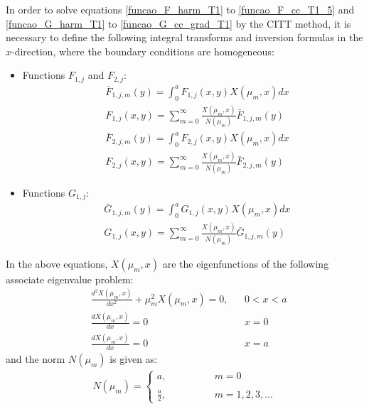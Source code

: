 \documentclass[conference,compsoc,fleqn]{IEEEtran}
\begin{document}
In order to solve equations \eqref{funcao_F_harm_T1} to \eqref{funcao_F_cc_T1_5} and \eqref{funcao_G_harm_T1} to \eqref{funcao_G_cc_grad_T1} by the CITT method, it is necessary to define the following integral transforms and inversion formulas\cite{livro_integral_transforms_cotta} in the $x$-direction, where the boundary conditions are homogeneous:
\begin{itemize}
	\item Functions $F_{1, j}$ and $F_{2, j}$:
	\begin{subequations}
		\begin{align}
		& \bar{F}_{1,j,m}(y) = \int_0^a F_{1, j}(x, y) X(\mu_m, x) dx \label{definicao_da_transf_F1}  \\
		& F_{1, j}(x, y) = \sum_{m=0}^\infty \frac{X(\mu_m, x)}{N(\mu_m)}\bar{F}_{1,j,m}(y) \label{definicao_da_transf_inv_F1}	 \\
		& \bar{F}_{2,j,m}(y) = \int_0^a F_{2, j}(x, y) X(\mu_m, x) dx \label{definicao_da_transf_F2}  \\
		& F_{2, j}(x, y) = \sum_{m=0}^\infty \frac{X(\mu_m, x)}{N(\mu_m)}\bar{F}_{2,j,m}(y) \label{definicao_da_transf_inv_F2}	
		\end{align}
	\end{subequations}
	\item Functions $G_{1, j}$:
	\begin{subequations}
		\begin{align}
		& \bar{G}_{1,j,m}(y) = \int_0^a G_{1, j}(x, y) X(\mu_m, x) dx \label{definicao_da_transf_G1}  \\
		& G_{1, j}(x, y) = \sum_{m=0}^\infty \frac{X(\mu_m, x)}{N(\mu_m)}\bar{G}_{1,j,m}(y) \label{definicao_da_transf_inv_G1}		
		\end{align}
	\end{subequations}
\end{itemize}

In the above equations, $X(\mu_m, x)$ are the eigenfunctions of the following associate eigenvalue problem\cite{livro_integral_transforms_cotta}:
\begin{subequations}
	\begin{alignat}{2}
	& \frac{d^2 X(\mu_m, x)}{d x^2} + \mu_m^2 X(\mu_m, x) = 0, && 0 < x < a \label{problema_vc_1a} \\
	& \frac{d X(\mu_m, x)}{d x} = 0 && x = 0 \label{problema_vc_1b} \\
	& \frac{d X(\mu_m, x)}{d x} = 0 && x = a \label{problema_vc_1c}
	\end{alignat}
\end{subequations}
and the norm $N(\mu_m)$ is given as\cite{livro_integral_transforms_cotta}:
\begin{align}
N(\mu_m) = \left\lbrace
\begin{array}{ll}
a, \quad\quad\quad\quad & m = 0 \\ \\
\frac{a}{2}, & m = 1,2,3,\ldots
\end{array}
\right. \label{valor_integral_norm}
\end{align}
\end{document}

